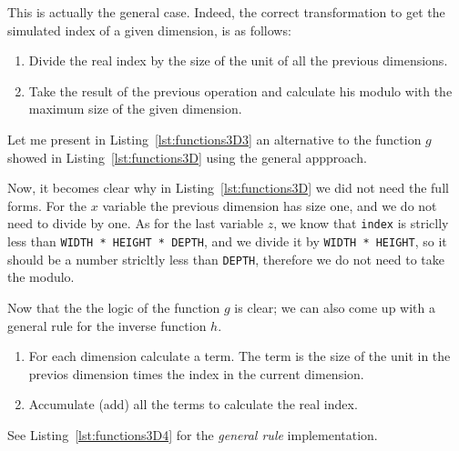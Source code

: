 This is actually the general case.
Indeed, the correct transformation to get the simulated index of a given dimension, is as follows:
\begin{enumerate}
  \item Divide the real index by the size of the unit of all the previous dimensions.
  \item Take the result of the previous operation and  calculate his modulo with the maximum size of the given dimension.
\end{enumerate}

Let me present in Listing~\ref{lst:functions3D3} an alternative to the function $g$ showed in Listing~\ref{lst:functions3D} using the general appproach.


Now, it becomes clear why in Listing~\ref{lst:functions3D} we did not need the full forms.
For the $x$ variable the previous dimension has size one, and we do not need to divide by one.
As for the last variable $z$, we know that \texttt{index} is striclly less than \texttt{WIDTH * HEIGHT * DEPTH}, and we divide it by \texttt{WIDTH * HEIGHT}, so it should be a number stricltly less than \texttt{DEPTH}, therefore we do not need to take the modulo.

Now that the the logic of the function $g$ is clear; we can also come up with a general rule for the inverse function $h$.

\begin{enumerate}
  \item For each dimension calculate a term.
        The term is the size of the unit in the previos dimension times the index in the current dimension.
  \item Accumulate (add) all the terms to calculate the real index.
\end{enumerate}

See Listing~\ref{lst:functions3D4} for the \emph{general rule} implementation.

